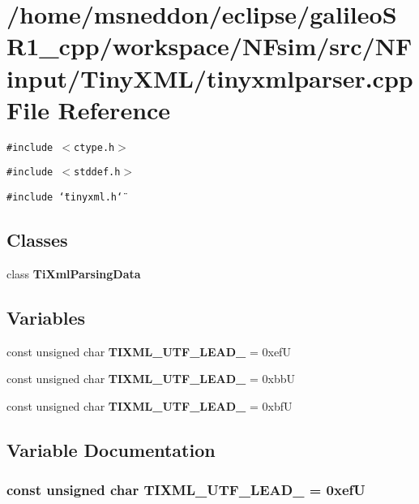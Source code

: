 \section{/home/msneddon/eclipse/galileoSR1\_\-cpp/workspace/NFsim/src/NFinput/TinyXML/tinyxmlparser.cpp File Reference}
\label{tinyxmlparser_8cpp}


{\tt \#include $<$ctype.h$>$}\par
{\tt \#include $<$stddef.h$>$}\par
{\tt \#include \char`\"{}tinyxml.h\char`\"{}}\par
\subsection*{Classes}
\begin{CompactItemize}
\item 
class {\bf TiXmlParsingData}
\end{CompactItemize}
\subsection*{Variables}
\begin{CompactItemize}
\item 
const unsigned char {\bf TIXML\_\-UTF\_\-LEAD\_} = 0xefU
\item 
const unsigned char {\bf TIXML\_\-UTF\_\-LEAD\_} = 0xbbU
\item 
const unsigned char {\bf TIXML\_\-UTF\_\-LEAD\_} = 0xbfU
\end{CompactItemize}


\subsection{Variable Documentation}
\subsubsection{\setlength{\rightskip}{0pt plus 5cm}const unsigned char {\bf TIXML\_\-UTF\_\-LEAD\_} = 0xefU}\label{tinyxmlparser_8cpp_37999e32163e2a3280bc0b8e1999774e}


